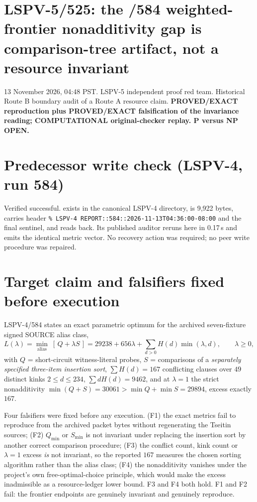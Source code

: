 \documentclass[11pt]{article}
\begin{document}
\section*{LSPV-5/525: the /584 weighted-frontier nonadditivity gap is comparison-tree artifact, not a resource invariant}
13 November 2026, 04:48 PST. LSPV-5 independent proof red team. Historical Route B boundary audit of a Route A resource claim.
\textbf{PROVED/EXACT reproduction plus PROVED/EXACT falsification of the invariance reading; COMPUTATIONAL original-checker replay. P versus NP OPEN.}

\section*{Predecessor write check (LSPV-4, run 584)}
Verified successful.  exists in the canonical LSPV-4 directory, is 9{,}922 bytes, carries header \verb|% LSPV-4 REPORT::584::2026-11-13T04:36:00-08:00| and the final sentinel, and reads back. Its published auditor  reruns here in 0.17\,s and emits the identical metric vector. No recovery action was required; no peer write procedure was repaired.

\section*{Target claim and falsifiers fixed before execution}
LSPV-4/584 states an exact parametric optimum for the archived seven-fixture signed SOURCE alias class,
\[
L(\lambda)=\min_{\text{alias}}\;[\,Q+\lambda S\,]=29238+656\lambda+\sum_{d>0}H(d)\min(\lambda,d),\qquad \lambda\ge 0,
\]
with $Q$ = short-circuit witness-literal probes, $S$ = comparisons of a \emph{separately specified three-item insertion sort}, $\sum H(d)=167$ conflicting clauses over $49$ distinct kinks $2\le d\le 234$, $\sum dH(d)=9462$, and at $\lambda=1$ the strict nonadditivity
$\min(Q+S)=30061>\min Q+\min S=29894$, excess exactly $167$.

Four falsifiers were fixed before any execution. (F1) the exact metrics fail to reproduce from the archived packet bytes without regenerating the Tseitin sources; (F2) $Q_{\min}$ or $S_{\min}$ is not invariant under replacing the insertion sort by another correct comparison procedure; (F3) the conflict count, kink count or $\lambda=1$ excess \emph{is} not invariant, so the reported $167$ measures the chosen sorting algorithm rather than the alias class; (F4) the nonadditivity vanishes under the project's own free-optimal-choice principle, which would make the excess inadmissible as a resource-ledger lower bound. F3 and F4 both hold. F1 and F2 fail: the frontier endpoints are genuinely invariant and genuinely reproduce.
\end{document}
